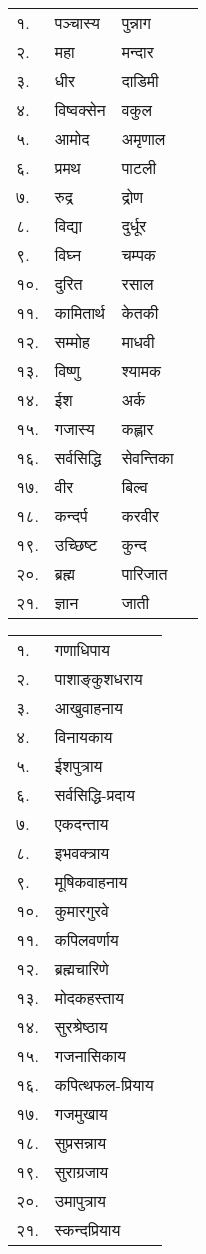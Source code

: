 \begin{center}
\begin{longtable}{ll@{-गणपतये नमः — }ll@{-पुष्पं समर्पयामि}}
    १. & पञ्चास्य & पुन्नाग&\\
    २. & महा & मन्दार&\\
    ३. & धीर &  दाडिमी&\\
    ४. & विष्वक्सेन &  वकुल&\\
    ५. & आमोद &  अमृणाल&\\
    ६. & प्रमथ &  पाटली&\\
    ७. & रुद्र &  द्रोण&\\
    ८. & विद्या &  दुर्धूर&\\
    ९. & विघ्न &  चम्पक&\\
    १०. & दुरित &  रसाल&\\
    ११. & कामितार्थ &  केतकी&\\
    १२. & सम्मोह &  माधवी&\\
    १३. & विष्णु &  श्यामक&\\
    १४. & ईश &  अर्क&\\
    १५. & गजास्य &  कह्लार&\\
    १६. & सर्वसिद्धि &  सेवन्तिका&\\
    १७. & वीर &  बिल्व&\\
    १८. & कन्दर्प &  करवीर&\\
    १९. & उच्छिष्ट &  कुन्द&\\
    २०. & ब्रह्म &  पारिजात&\\
    २१. & ज्ञान &  जाती&\\
\end{longtable}
    

\begin{longtable}{ll@{~नमः — दूर्वायुग्मं समर्पयामि।}}
    १. & गणाधिपाय \\
    २. & पाशाङ्कुशधराय \\
    ३. & आखुवाहनाय \\
    ४. & विनायकाय \\
    ५. & ईशपुत्राय \\
    ६. & सर्वसिद्धि-प्रदाय \\
    ७. & एकदन्ताय \\
    ८. & इभवक्त्राय \\
    ९. & मूषिकवाहनाय \\
    १०. & कुमारगुरवे \\
    ११. & कपिलवर्णाय \\
    १२. & ब्रह्मचारिणे \\
    १३. & मोदकहस्ताय \\
    १४. & सुरश्रेष्ठाय \\
    १५. & गजनासिकाय \\
    १६. & कपित्थफल-प्रियाय \\
    १७. & गजमुखाय \\
    १८. & सुप्रसन्नाय \\
    १९. & सुराग्रजाय \\
    २०. & उमापुत्राय \\
    २१. & स्कन्दप्रियाय \\
\end{longtable}
    


\end{center}
